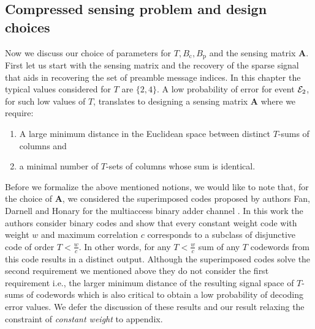 \subsection{Compressed sensing problem and design choices}
Now we discuss our choice of parameters for $T, B_\mathrm{c}, B_\mathrm{p}$ and the sensing matrix $\mathbf{A}$. First let us start with the sensing matrix and the recovery of the sparse signal that aids in recovering the set of preamble message indices. In this chapter the typical values considered for $T$  are $\{2,4\}$. A low probability of error for event $\mathcal{E}_2$, for such low values of $T$, translates to  designing a sensing matrix $\mathbf{A}$ where we require: 
\begin{enumerate}
\item A large minimum distance in the Euclidean space between distinct $T$-sums of columns and 
\item a minimal number of $T$-sets of columns whose sum is identical.
\end{enumerate} 
Before we formalize the above mentioned notions, we would like to note that, for the choice of $\mathbf{A}$, we considered the superimposed codes proposed by authors Fan, Darnell and Honary for the multiaccess binary adder channel \cite{fan1995superimposed}. In this work the authors consider binary codes and show that every constant weight code with weight $w$ and maximum correlation $c$ corresponds to a subclass of disjunctive code of order $T<\frac{w}{c}$. In other words, for any $T<\frac{w}{c}$ sum of any $T$ codewords from this code results in a distinct output. Although the superimposed codes solve the second requirement we mentioned above they do not consider the first requirement i.e., the larger minimum distance of the resulting signal space of $T$-sums of codewords which is also critical to obtain a low probability of decoding error values. We defer the discussion of these results and our result relaxing the constraint of \textit{constant weight} to appendix.

